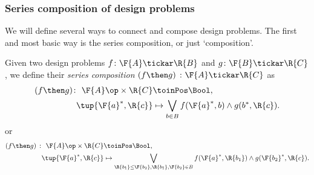 %
%
%


\subsubsection{Series composition of design problems}

We will define several ways to connect and compose design problems. The first and most basic way is the series composition, or just `composition'.

\begin{definition}
\label{def:dp-series}
Given two design problems $f \colon  \F{A} \tickar \R{B}$ and $g \colon \F{B} \tickar \R{C}$, we define their \emph{series composition}
$(f\then g)\ \colon  \F{A} \tickar \R{C}$
as
\begin{equation}
\label{eq:composition2}
\begin{aligned}
   (f \then g)  \colon \ \F{A}\op \times \R{C} & \toinPos  \Bool, \\
  \tup{\F{a}^*, \R{c}} &\mapsto \bigvee_{b\in B} f(\F{a}^*,b) \wedge g(b^*,\R{c}).
\end{aligned}
\end{equation}
or
\begin{equation}
\begin{aligned}
\label{eq:composition}
   (f \then g)\  \colon \ \F{A}\op \times \R{C} & \toinPos  \Bool,  \\
  \tup{\F{a}^*, \R{c}} &\mapsto \bigvee_{\R{b_1}\leq\F{b_2}, \R{b_1},\F{b_2}\in B} f(\F{a}^*,\R{b_1}) \wedge g(\F{b_2}^*,\R{c}).
\end{aligned}
\end{equation}
\end{definition}


